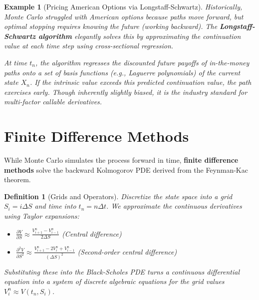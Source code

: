 \documentclass{report}
\theoremstyle{spacedplain}
\theoremstyle{spaceddefinition}
\newtheorem{definition}[theorem]{Definition}
\newtheorem{example}[theorem]{Example}
\theoremstyle{spacedremark}
\begin{document}
\begin{example}[Pricing American Options via Longstaff-Schwartz]
Historically, Monte Carlo struggled with American options because paths move forward, but optimal stopping requires knowing the future (working backward). The \textbf{Longstaff-Schwartz algorithm} elegantly solves this by approximating the continuation value at each time step using cross-sectional regression. 

At time $t_n$, the algorithm regresses the discounted future payoffs of in-the-money paths onto a set of basis functions (e.g., Laguerre polynomials) of the current state $X_n$. If the intrinsic value exceeds this predicted continuation value, the path exercises early. Though inherently slightly biased, it is the industry standard for multi-factor callable derivatives.
\end{example}

\section{Finite Difference Methods}

While Monte Carlo simulates the process forward in time, \textbf{finite difference methods} solve the backward Kolmogorov PDE derived from the Feynman-Kac theorem.

\begin{definition}[Grids and Operators]
Discretize the state space into a grid $S_i = i\Delta S$ and time into $t_n = n\Delta t$. We approximate the continuous derivatives using Taylor expansions:
\begin{itemize}
    \item $\frac{\partial V}{\partial S} \approx \frac{V_{i+1}^n - V_{i-1}^n}{2\Delta S}$ (Central difference)
    \item $\frac{\partial^2 V}{\partial S^2} \approx \frac{V_{i+1}^n - 2V_i^n + V_{i-1}^n}{(\Delta S)^2}$ (Second-order central difference)
\end{itemize}
Substituting these into the Black-Scholes PDE turns a continuous differential equation into a system of discrete algebraic equations for the grid values $V_i^n \approx V(t_n,S_i)$.
\end{definition}
\end{document}

